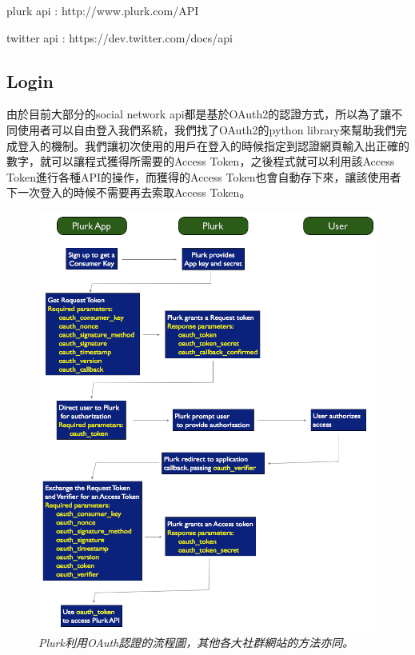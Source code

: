 \documentclass[12pt]{article}
\begin{document}
plurk api : http://www.plurk.com/API

twitter api : https://dev.twitter.com/docs/api

\subsection{Login}

由於目前大部分的social network api都是基於OAuth2的認證方式，所以為了讓不同使用者可以自由登入我們系統，我們找了OAuth2的python library來幫助我們完成登入的機制。我們讓初次使用的用戶在登入的時候指定到認證網頁輸入出正確的數字，就可以讓程式獲得所需要的Access Token，之後程式就可以利用該Access Token進行各種API的操作，而獲得的Access Token也會自動存下來，讓該使用者下一次登入的時候不需要再去索取Access Token。

\begin{figure}[t]
\centering
\includegraphics[width=15cm]{Plurk_Oauth.png}
\caption{{\it Plurk利用OAuth認證的流程圖，其他各大社群網站的方法亦同。}}
\label{fig:plurk_oauth}
\end{figure}
\end{document}
